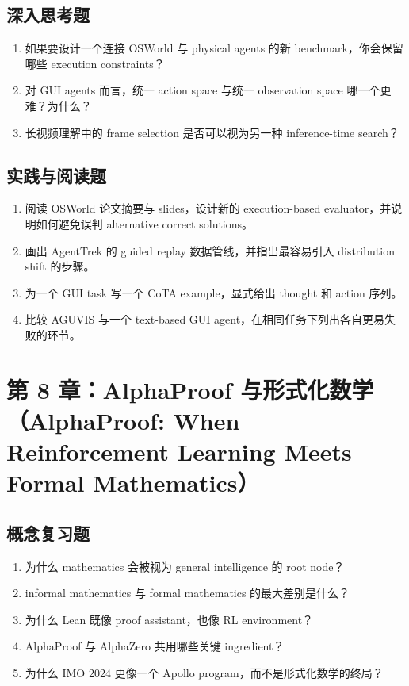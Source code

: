 \subsection*{深入思考题}
\begin{enumerate}
\item 如果要设计一个连接 OSWorld 与 physical agents 的新 benchmark，你会保留哪些 execution constraints？
\item 对 GUI agents 而言，统一 action space 与统一 observation space 哪一个更难？为什么？
\item 长视频理解中的 frame selection 是否可以视为另一种 inference-time search？
\end{enumerate}

\subsection*{实践与阅读题}
\begin{enumerate}
\item 阅读 OSWorld 论文摘要与 slides，设计新的 execution-based evaluator，并说明如何避免误判 alternative correct solutions。
\item 画出 AgentTrek 的 guided replay 数据管线，并指出最容易引入 distribution shift 的步骤。
\item 为一个 GUI task 写一个 CoTA example，显式给出 thought 和 action 序列。
\item 比较 AGUVIS 与一个 text-based GUI agent，在相同任务下列出各自更易失败的环节。
\end{enumerate}

\section{第 8 章：AlphaProof 与形式化数学（AlphaProof: When Reinforcement Learning Meets Formal Mathematics）}

\subsection*{概念复习题}
\begin{enumerate}
\item 为什么 mathematics 会被视为 general intelligence 的 root node？
\item informal mathematics 与 formal mathematics 的最大差别是什么？
\item 为什么 Lean 既像 proof assistant，也像 RL environment？
\item AlphaProof 与 AlphaZero 共用哪些关键 ingredient？
\item 为什么 IMO 2024 更像一个 Apollo program，而不是形式化数学的终局？
\end{enumerate}

